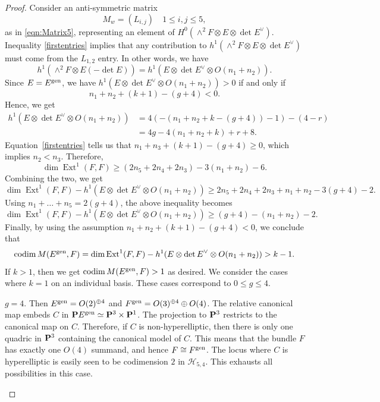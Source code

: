 \documentclass{article}
\renewcommand {\P}{{\bf P}}
\providecommand{\Ext}{\operatorname{Ext}}
\providecommand{\codim}{\operatorname{codim}}
\renewcommand{\H}{\mathcal H}
\newcommand{\gen}{{\rm gen}}
\numberwithin{equation}{section}
\begin{document}
\begin{proof}
   Consider an anti-symmetric matrix
   \[
   M_{w} = (L_{i,j}) \quad 1 \leq i, j \leq 5,\] as in
   \eqref{eqn:Matrix5}, representing an element of $H^{0}(\wedge^2 F
   \otimes E \otimes \det E^\vee)$. Inequality
   \eqref{firstentries} implies that any contribution to
   $h^1(\wedge^2 F \otimes E \otimes \det E^\vee)$ must come from the
   $L_{1,2}$ entry. In other words, we have
   \[h^1(\wedge^2 F \otimes E(-\det E)) = h^{1}(E\otimes  {\det E}^\vee \otimes O(n_1 + n_2)).\]
   Since $E = E^\gen$, we have $h^{1}(E\otimes {\det E}^\vee \otimes O(n_1 + n_2)) > 0$ if and only if 
   \[n_1 + n_2 + (k+1)-(g+4) < 0.\]
   Hence, we get
   \begin{align*}
     h^{1}(E\otimes  {\det E}^\vee \otimes O(n_1 + n_2)) &= 4(-(n_1 + n_2 + k -(g+4))-1) - (4-r) \\
     &= 4g - 4(n_1+n_2+k) + r + 8.
   \end{align*}
   Equation~\eqref{firstentries} tells us that $n_1 + n_3 + (k+1) -(g+4) \geq 0$, which implies $n_2 < n_3$. Therefore, 
   \[\dim \Ext^{1}(F,F) \geq (2n_5 + 2n_4 + 2n_3) - 3(n_1 + n_2) - 6.\] 
   Combining the two, we get
   \[\dim \Ext^{1}(F,F) - h^{1}(E\otimes  {\det E}^\vee \otimes O(n_1 + n_2)) \geq 2n_5+2n_4 +2n_3 + n_1 + n_2 -3(g+4)-2.\]
   Using $n_1 + \dots + n_5 = 2(g+4)$,  the above inequality becomes
   \[\dim \Ext^{1}(F,F) - h^{1}(E\otimes {\det E}^\vee \otimes O(n_1 + n_2)) \geq (g+4) - (n_1 + n_2) - 2.\]
   Finally, by using the assumption $n_1 + n_2 + (k+1) - (g+4) < 0$, we conclude that 
   \[\codim M(E^\gen, F) = \dim \Ext^{1}(F,F) - h^{1}(E\otimes {\det E}^\vee \otimes O(n_1 + n_2)) > k-1.\]
   If $k > 1$, then we get $\codim M(E^\gen, F) > 1$ as desired. We
   consider the cases where $k = 1$ on an individual basis. These
   cases correspond to $0 \leq g \leq 4$.

   \begin{asparaitem}
   \item $g = 4$. Then $E^\gen = O(2)^{\oplus 4}$ and $F^\gen = O(3)^{\oplus 4} \oplus O(4)$. The relative canonical map embeds $C$ in $\P E^\gen \simeq \P^3 \times \P^1$. The projection to $\P^3$ restricts to the canonical map on $C$. Therefore, if $C$ is non-hyperelliptic, then there is only one quadric in $\P^3$ containing the canonical model of $C$.  This means that the bundle $F$ has exactly one $O(4)$ summand, and hence $F \cong F^\gen$. The locus where $C$ is hyperelliptic  is easily seen to be codimension $2$ in $\H_{5,4}$. This exhausts all possibilities in this case.


\end{asparaitem}
\end{proof}
\end{document}
